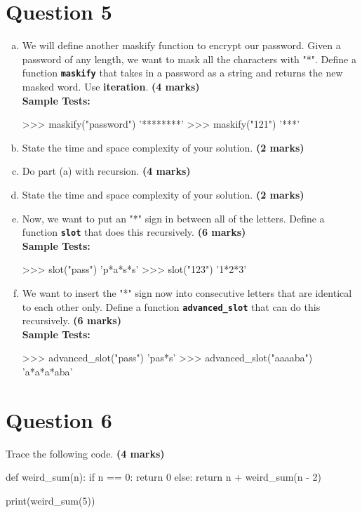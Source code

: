 \section{Question 5}
\begin{enumerate}[(a)]
\item We will define another maskify function to encrypt our password. Given a password
of any length, we want to mask all the characters with "*". Define a function \texttt{\bfseries maskify}
that takes in a password as a string and returns the new masked word. Use \textbf{iteration}. \textbf{(4 marks)} \\
\textbf{Sample Tests:}
\begin{python}
>>> maskify("password")
'********'
>>> maskify("121")
'***'
\end{python}

\item State the time and space complexity of your solution. \textbf{(2 marks)}

\item Do part (a) with recursion. \textbf{(4 marks)}

\item State the time and space complexity of your solution. \textbf{(2 marks)}

\item Now, we want to put an "*" sign in between all of the letters. Define a function \texttt{\bfseries slot}
that does this recursively. \textbf{(6 marks)} \\
\textbf{Sample Tests:}
\begin{python}
>>> slot("pass")
'p*a*s*s'
>>> slot("123")
'1*2*3'
\end{python}

\item We want to insert the "*" sign now into consecutive letters that are identical to each
other only. Define a function \texttt{\bfseries advanced\_slot} that can do this recursively. \textbf{(6 marks)} \\
\textbf{Sample Tests:}
\begin{python}
>>> advanced_slot("pass")
'pas*s'
>>> advanced_slot("aaaaba")
'a*a*a*aba'
\end{python}
\end{enumerate}

\newpage

\section{Question 6}
Trace the following code. \textbf{(4 marks)}
\begin{python}
def weird_sum(n):
    if n == 0:
        return 0 
    else:
        return n + weird_sum(n - 2)

print(weird_sum(5))
\end{python}

